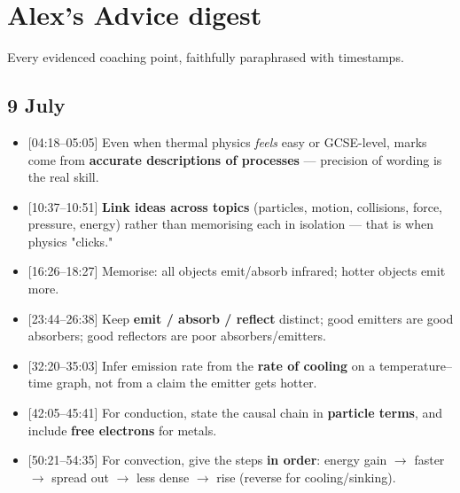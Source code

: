 \documentclass[11pt,a4paper]{article}
\newcommand{\ts}[1]{\textup{[#1]}}       %
\begin{document}
\section{Alex's Advice digest}

Every evidenced coaching point, faithfully paraphrased with timestamps.

\subsection{9 July}
\begin{advicebox}
\begin{itemize}[leftmargin=1.3em,itemsep=3pt]
  \item \ts{04:18--05:05} Even when thermal physics \emph{feels} easy or GCSE-level, marks
        come from \textbf{accurate descriptions of processes} --- precision of wording is
        the real skill.
  \item \ts{10:37--10:51} \textbf{Link ideas across topics} (particles, motion, collisions,
        force, pressure, energy) rather than memorising each in isolation --- that is when
        physics "clicks."
  \item \ts{16:26--18:27} Memorise: all objects emit/absorb infrared; hotter objects emit
        more.
  \item \ts{23:44--26:38} Keep \textbf{emit / absorb / reflect} distinct; good emitters are
        good absorbers; good reflectors are poor absorbers/emitters.
  \item \ts{32:20--35:03} Infer emission rate from the \textbf{rate of cooling} on a
        temperature--time graph, not from a claim the emitter gets hotter.
  \item \ts{42:05--45:41} For conduction, state the causal chain in \textbf{particle
        terms}, and include \textbf{free electrons} for metals.
  \item \ts{50:21--54:35} For convection, give the steps \textbf{in order}: energy gain
        $\to$ faster $\to$ spread out $\to$ less dense $\to$ rise (reverse for
        cooling/sinking).
\end{itemize}
\end{advicebox}
\end{document}
